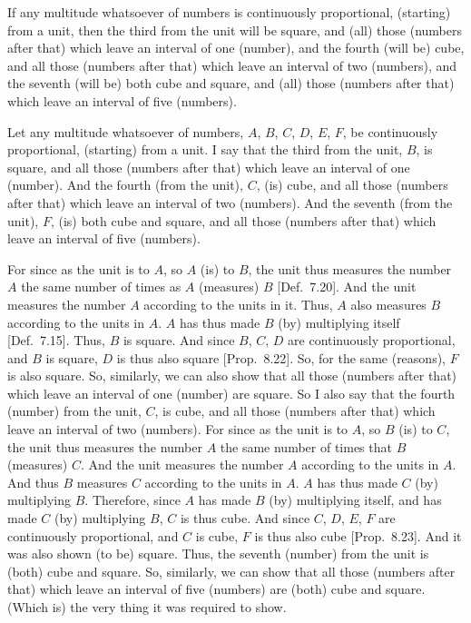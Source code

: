 \begin{Parallel}{}{}
{If any multitude whatsoever of numbers is continuously proportional, (starting) from a unit, then the third from the unit will be 
square, and (all) those (numbers after that) which leave an interval of  one (number), and the fourth (will
be) cube, and all those (numbers after that) which leave an interval of two (numbers), and the seventh
(will be) both cube and square, and (all) those (numbers after that) which leave an interval of five (numbers).

\epsfysize=1.8in
\centerline{}

Let any multitude whatsoever of numbers, $A$, $B$, $C$, $D$, $E$, $F$, be continuously proportional, (starting) from a unit. I say that the third from the unit, $B$, is square, and all those (numbers after that) which leave an interval of one (number). And the fourth (from the unit), $C$,
(is)  cube, and all those (numbers after that) which leave an
interval of two (numbers). And the seventh (from the unit), $F$, (is)
both cube and square,  and all those (numbers after that) which leave an interval of five (numbers).

For since as the unit is to $A$, so $A$ (is) to $B$, the unit thus measures the number $A$
the same number of times as $A$ (measures) $B$ [Def.~7.20]. And the unit measures the number $A$
according to the units in it. Thus, $A$ also measures $B$ according to the units
in $A$. $A$ has thus made $B$ (by) multiplying itself [Def.~7.15].  Thus, $B$ is  square. And
since $B$, $C$, $D$ are continuously proportional, and $B$ is  square, $D$ is thus also  square  
[Prop.~8.22]. So, for the same (reasons), $F$ is also
 square. So, similarly, we can also show that all those (numbers after that) which leave an interval of  one (number) are square. 
So I also say that the fourth (number) from the unit, $C$,  is  cube, and
all those (numbers after that) which leave an interval of two (numbers).
For since as the unit is to $A$, so $B$ (is) to $C$, the unit thus measures the
number $A$ the same number of times that $B$ (measures) $C$. And the
unit measures the number $A$ according to the units in $A$. And thus
$B$ measures $C$ according to the units in $A$.  $A$ has thus made $C$
(by) multiplying $B$. Therefore, since $A$ has made $B$ (by) multiplying
itself, and has made $C$ (by) multiplying $B$, $C$ is thus  cube. And since $C$, $D$, $E$, $F$ are continuously proportional, and
$C$ is cube, $F$ is thus also  cube  [Prop.~8.23]. And it was also shown (to be) 
square. Thus, the seventh (number) from the unit is (both) 
cube and  square. So, similarly, we can show that  all those (numbers after that) which leave an interval of five (numbers) are (both)
cube and square. (Which is) the very thing it was required to show.}
\end{Parallel}

